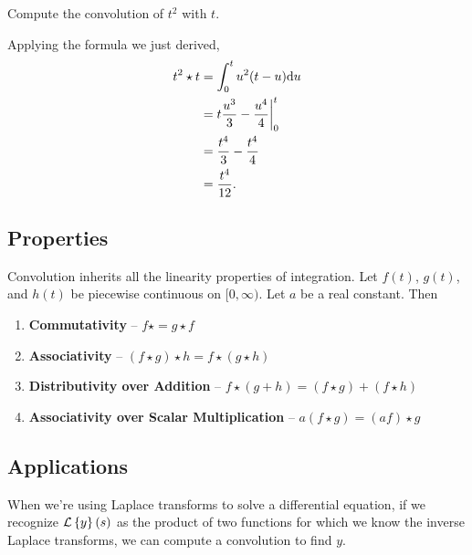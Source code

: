 \begin{example}
	Compute the convolution of $t^2$ with $t$.
\end{example}
\noindent
Applying the formula we just derived,
\begin{align*}
	t^2 \star t &= \int_{0}^{t}{u^2(t-u)\mathrm{d} u} \\
	&= t\frac{u^3}{3} - \frac{u^4}{4} \bigg\rvert_{0}^{t} \\
	&= \frac{t^4}{3} - \frac{t^4}{4} \\
	&= \frac{t^4}{12}.
\end{align*}

\subsection{Properties}
Convolution inherits all the linearity properties of integration.
Let $f(t)$, $g(t)$, and $h(t)$ be piecewise continuous on $[0,\infty)$.
Let $a$ be a real constant.
Then
\begin{enumerate}[label=]
	\item \textbf{Commutativity} -- $f \star = g \star f$
	\item \textbf{Associativity} -- $(f \star g) \star h = f \star (g \star h)$
	\item \textbf{Distributivity over Addition} -- $f \star (g + h) = (f \star g) + (f \star h)$
	\item \textbf{Associativity over Scalar Multiplication} -- $a(f \star g) = (af) \star g$
\end{enumerate}

\subsection{Applications}
When we're using Laplace transforms to solve a differential equation, if we recognize $\mathcal{L}\left\{ y \right\}\left(s\right)$ as the product of two functions for which we know the inverse Laplace transforms, we can compute a convolution to find $y$.

